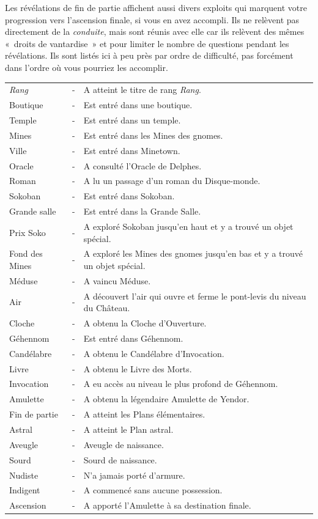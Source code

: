 \documentclass[titlepage]{article}
\begin{document}
Les révélations de fin de partie affichent aussi divers exploits qui
marquent votre progression vers l'ascension finale, si vous en avez
accompli.
Ils ne relèvent pas directement de la \textit{conduite}, mais sont réunis avec
elle car ils relèvent des mêmes «~droits de vantardise~» et pour
limiter le nombre de questions pendant les révélations.
Ils sont listés ici à peu près par ordre de difficulté, pas forcément dans
l'ordre où vous pourriez les accomplir.
\medskip
\begin{center}
\begin{tabular}{lll}
\textit{Rang} & - & A atteint le titre de rang \textit{Rang}.\\
Boutique & - & Est entré dans une boutique.\\
Temple & - & Est entré dans un temple.\\
Mines & - & Est entré dans les Mines des gnomes.\\
Ville & - & Est entré dans Minetown.\\
Oracle & - & A consulté l'Oracle de Delphes.\\
Roman & - & A lu un passage d'un roman du Disque-monde.\\
Sokoban & - & Est entré dans Sokoban.\\
Grande salle & - & Est entré dans la Grande Salle.\\
Prix Soko & - & A exploré Sokoban jusqu'en haut et y a trouvé un objet spécial.\\
Fond des Mines & - & A exploré les Mines des gnomes jusqu'en bas et y a trouvé un objet spécial.\\
Méduse & - & A vaincu Méduse.\\
Air & - & A découvert l'air qui ouvre et ferme le pont-levis du niveau du Château.\\
Cloche & - & A obtenu la Cloche d'Ouverture.\\
Géhennom & - & Est entré dans Géhennom.\\
Candélabre & - & A obtenu le Candélabre d'Invocation.\\
Livre & - & A obtenu le Livre des Morts.\\
Invocation & - & A eu accès au niveau le plus profond de Géhennom.\\
Amulette & - & A obtenu la légendaire Amulette de Yendor.\\
Fin de partie & - & A atteint les Plans élémentaires.\\
Astral & - & A atteint le Plan astral.\\
Aveugle & - & Aveugle de naissance.\\
Sourd & - & Sourd de naissance.\\
Nudiste & - & N'a jamais porté d'armure.\\
Indigent & - & A commencé sans aucune possession.\\
Ascension & - & A apporté l'Amulette à sa destination finale.\\
\end{tabular}
\end{center}
\medskip
\end{document}
